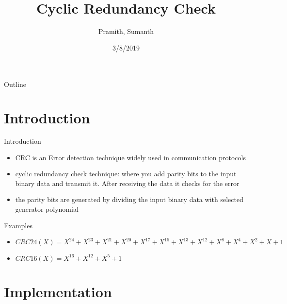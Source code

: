 \documentclass{beamer}
\title[Your Short Title]{Cyclic Redundancy Check}
\author{Pramith, Sumanth}
\date{3/8/2019}
\begin{document}
\begin{frame}
  \titlepage
\end{frame}

\begin{frame}{Outline}
 \tableofcontents
\end{frame}

\section{Introduction}

\begin{frame}{Introduction}

\begin{itemize}
    \item CRC is an Error detection technique widely used in communication protocols
    \item cyclic redundancy check technique: where you add parity bits to the input binary data and transmit it. After receiving the data it checks for the error
    \item the parity bits are generated by dividing the input binary data with selected generator polynomial
    
\end{itemize}

\vskip 1cm

\begin{block}{Examples}
\begin{itemize}
    \item $CRC24(X) = X^{24} + X^{23} + X^{21} + X^{20} + X^{17} + X^{15} + X^{13} + X^{12} + X^{8} + X^{4} + X^{2} + X + 1$
    \item $CRC16(X) = X^{16} + X^{12} + X^{5} + 1$
\end{itemize}
\end{block}

\end{frame}


\section{Implementation}
\end{document}
